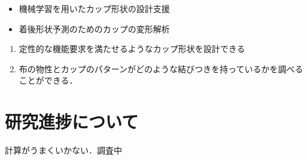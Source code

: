\documentclass[11pt]{jsarticle}
\begin{document}
	\articleSPRabst
		\begin{itemize}
			\item 機械学習を用いたカップ形状の設計支援
			\item 着後形状予測のためのカップの変形解析
		\end{itemize}
		
		
	\articleSPRobj
		\begin{enumerate}
			\item 定性的な機能要求を満たせるようなカップ形状を設計できる
			\item 布の物性とカップのパターンがどのような結びつきを持っているかを調べることができる．
		\end{enumerate}
	\articleSPRitemsone
		
		\tableofcontents
		
		
	\articleSPRitemstwo
	\renewcommand{\labelitemi}{$\blacktriangledown$}
	\newcommand{\argmax}{\mathop{\rm arg~max}\limits}
	\newcommand{\argmin}{\mathop{\rm arg~min}\limits}
	\section{研究進捗について}
		計算がうまくいかない．調査中
\end{document}
